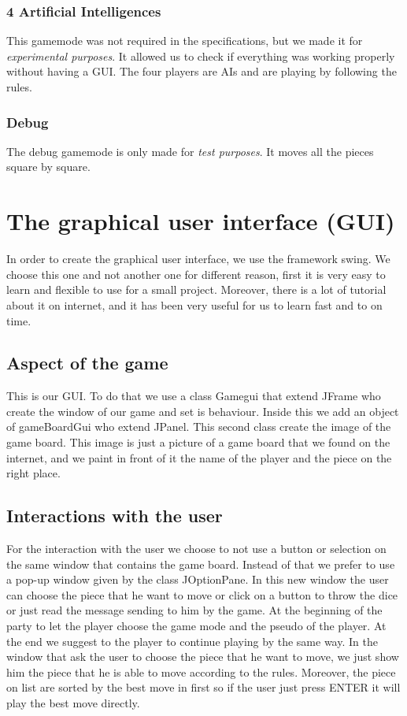 \documentclass[english, 11pt, titlepage]{article}
\begin{document}
    \subsubsection{4 Artificial Intelligences}
    This gamemode was not required in the specifications, but we made it for \emph{experimental purposes}. It allowed us to check if everything was working properly without having a GUI. The four players are AIs and are playing by following the rules.
    
    \subsubsection{Debug}
    The debug gamemode is only made for \emph{test purposes}. It moves all the pieces square by square.

    \section{The graphical user interface (GUI)}

    In order to create the graphical user interface, we use the framework swing. We choose this one and not another one for different reason, first it is very easy to learn and flexible to use for a small project. Moreover, there is a lot of tutorial about it on internet, and it has been very useful for us to learn fast and to on time.


    \subsection{Aspect of the game}


    This is our GUI. To do that we use a class Gamegui that extend JFrame who create the window of our game and set is behaviour. Inside this we add an object of gameBoardGui who extend JPanel. This second class create the image of the game board. This image is just a picture of a game board that we found on the internet, and we paint in front of it the name of the player and the piece on the right place.



    \subsection{Interactions with the user}

    For the interaction with the user we choose to not use a button or selection on the same window that contains the  game board. Instead of that we prefer to use a pop-up window given by the class JOptionPane. In this new window the user can choose the piece that he want to move or click on a button to throw the dice or just read the message sending to him by the game. At the beginning of the party to let the player choose the game mode and the pseudo of the player. At the end we suggest to the player to continue playing by the same way. In the window that ask the user to choose the piece that he want to move, we just show him the piece that he is able to move according to the rules. Moreover, the piece on list are sorted by the best move in first so if the user just press ENTER it will play the best move directly.
\end{document}
